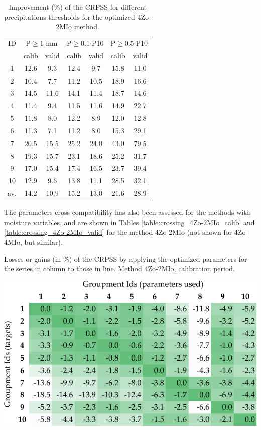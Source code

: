 \documentclass[5p]{elsarticle}
\begin{document}
\begin{table}[htbp]
	\caption{Improvement (\%) of the CRPSS for different precipitations thresholds for the optimized 4Zo-2MIo method.}
	\footnotesize
	\begin{center}
		\begin{tabular}{ccccccc}
			\hline 
			ID & \multicolumn{2}{c}{P\(\geq\)1 mm} & \multicolumn{2}{c}{P\(\geq\)0.1\(\cdot\)P10} & \multicolumn{2}{c}{P\(\geq\)0.5\(\cdot\)P10} \\  
			& calib & valid & calib & valid & calib & valid \\ 
			\hline 
			1 & 12.6 & 9.3 & 12.4 & 9.7 & 15.8 & 11.0 \\
			2 & 10.4 & 7.7 & 11.2 & 10.5 & 18.9 & 16.6 \\ 
			3 & 14.5 & 11.6 & 14.1 & 11.4 & 18.7 & 14.6 \\ 
			4 & 11.4 & 9.4 & 11.5 & 11.6 & 14.9 & 22.7 \\ 
			5 & 11.8 & 8.0 & 12.2 & 8.9 & 12.0 & 12.8 \\ 
			6 & 11.3 & 7.1 & 11.2 & 8.0 & 15.3 & 29.1 \\ 
			7 & 20.5 & 15.5 & 25.2 & 24.0 & 43.0 & 79.5 \\
			8 & 19.3 & 15.7 & 23.1 & 18.6 & 25.2 & 31.7 \\ 
			9 & 17.0 & 15.4 & 17.4 & 16.5 & 23.7 & 39.4 \\ 
			10 & 12.9 & 9.6 & 13.8 & 11.1 & 28.5 & 32.1 \\ 
			\hline 
			av. & 14.2 & 10.9 & 15.2 & 13.0 & 21.6 & 28.9 \\ 
			\hline 
		\end{tabular} 
	\end{center}
	\label{table:scores_thresholds_4Zo-2MIo}
\end{table}

The parameters cross-compatibility has also been assessed for the methods with moisture variables, and are shown in Tables \ref{table:crossing_4Zo-2MIo_calib} and \ref{table:crossing_4Zo-2MIo_valid} for the method 4Zo-2MIo (not shown for 4Zo-4MIo, but similar).


\begin{table}[htb]
	\caption{Losses or gains (in \%) of the CRPSS by applying the optimized parameters for the series in column to those in line. Method 4Zo-2MIo, calibration period.}
	\centerline{\includegraphics[width=\linewidth]{figures/table_crossing_z4-hi2_calib.pdf}}
	\label{table:crossing_4Zo-2MIo_calib}
\end{table}
\end{document}
